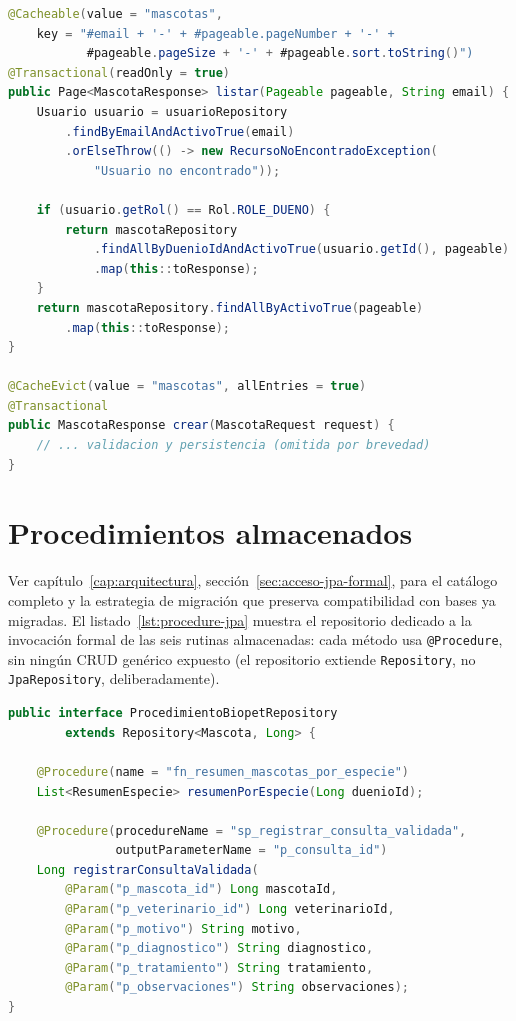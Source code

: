 \begin{lstlisting}[language=Java,caption={Patr\'on \emph{cache-aside} declarativo en \texttt{MascotaService.java} (fragmento real).},label={lst:cache-aside}]
@Cacheable(value = "mascotas",
    key = "#email + '-' + #pageable.pageNumber + '-' +
           #pageable.pageSize + '-' + #pageable.sort.toString()")
@Transactional(readOnly = true)
public Page<MascotaResponse> listar(Pageable pageable, String email) {
    Usuario usuario = usuarioRepository
        .findByEmailAndActivoTrue(email)
        .orElseThrow(() -> new RecursoNoEncontradoException(
            "Usuario no encontrado"));

    if (usuario.getRol() == Rol.ROLE_DUENO) {
        return mascotaRepository
            .findAllByDuenioIdAndActivoTrue(usuario.getId(), pageable)
            .map(this::toResponse);
    }
    return mascotaRepository.findAllByActivoTrue(pageable)
        .map(this::toResponse);
}

@CacheEvict(value = "mascotas", allEntries = true)
@Transactional
public MascotaResponse crear(MascotaRequest request) {
    // ... validacion y persistencia (omitida por brevedad)
}
\end{lstlisting}

\section{Procedimientos almacenados}

Ver cap\'itulo~\ref{cap:arquitectura}, secci\'on~\ref{sec:acceso-jpa-formal},
para el cat\'alogo completo y la estrategia de migraci\'on que preserva
compatibilidad con bases ya migradas. El listado~\ref{lst:procedure-jpa}
muestra el repositorio dedicado a la invocaci\'on formal de las seis
rutinas almacenadas: cada m\'etodo usa \texttt{@Procedure}, sin ning\'un
CRUD gen\'erico expuesto (el repositorio extiende \texttt{Repository}, no
\texttt{JpaRepository}, deliberadamente).

\begin{lstlisting}[language=Java,caption={Acceso JPA formal a procedimientos almacenados en \texttt{ProcedimientoBiopetRepository.java} (fragmento real).},label={lst:procedure-jpa}]
public interface ProcedimientoBiopetRepository
        extends Repository<Mascota, Long> {

    @Procedure(name = "fn_resumen_mascotas_por_especie")
    List<ResumenEspecie> resumenPorEspecie(Long duenioId);

    @Procedure(procedureName = "sp_registrar_consulta_validada",
               outputParameterName = "p_consulta_id")
    Long registrarConsultaValidada(
        @Param("p_mascota_id") Long mascotaId,
        @Param("p_veterinario_id") Long veterinarioId,
        @Param("p_motivo") String motivo,
        @Param("p_diagnostico") String diagnostico,
        @Param("p_tratamiento") String tratamiento,
        @Param("p_observaciones") String observaciones);
}
\end{lstlisting}

